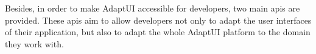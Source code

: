 Besides, in order to make AdaptUI accessible for developers, two main \acp{api}
are provided. These \acp{api} aim to allow developers not only to adapt the
user interfaces of their application, but also to adapt the whole AdaptUI platform
to the domain they work with.


